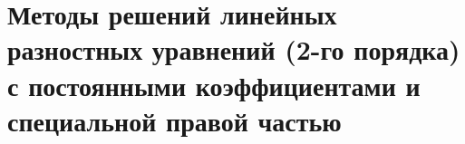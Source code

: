 \documentclass[__main__.tex]{subfiles}
\begin{document}
\section{Методы решений линейных разностных уравнений (2-го порядка) с постоянными коэффициентами и специальной правой частью}
\end{document}
